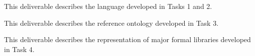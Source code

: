 \begin{workpackage}
\begin{tasklist}


\end{tasklist}


\begin{wpdelivs}
  \begin{wpdeliv}[due=28,id=deliv-str-framework,dissem=PU,nature=R,lead=Sac]
        {This deliverable describes the language developed in Tasks 1 and 2.}
  \end{wpdeliv}
  \begin{wpdeliv}[due=36,id=deliv-str-ontology,dissem=PU,nature=R,lead=Sac]
        {This deliverable describes the reference ontology developed in Task 3.}
  \end{wpdeliv}
  \begin{wpdeliv}[due=48,id=deliv-str-libraries,dissem=PU,nature=R,lead=Fau]
        {This deliverable describes the representation of major formal libraries developed in Task 4.}
  \end{wpdeliv}
\end{wpdelivs}



\end{workpackage}
